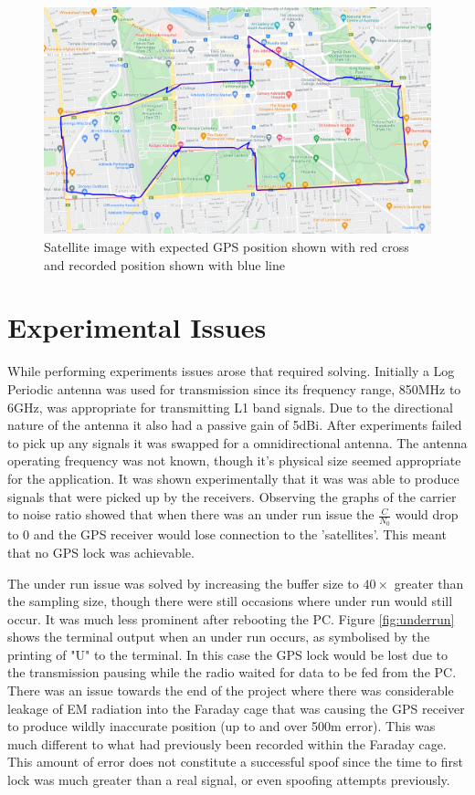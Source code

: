\begin{figure}[H]
    \begin{centering}
        \includegraphics[width=14cm,keepaspectratio]{Figures/2021_3_30_dynamic_CBD_Satellite.PNG}
        \caption{Satellite image with expected GPS position shown with red cross and recorded position shown with blue line}
        \label{fig:CBDdynamicSatelliteImage}
    \end{centering}
\end{figure}

\section{Experimental Issues}
While performing experiments issues arose that required solving. Initially a Log Periodic antenna was used for transmission since its
frequency range, 850MHz to 6GHz, was appropriate for transmitting L1 band signals. Due to the directional nature of the antenna it also had a passive gain of 5dBi. 
After experiments failed to pick up any signals it was swapped for a omnidirectional antenna. The
antenna operating frequency was not known, though it's physical size seemed appropriate for the application. 
It was shown experimentally that it was
was able to produce signals that were picked up by the receivers. Observing the graphs of the carrier to noise ratio showed that when there was an under run
issue the $\frac{C}{N_0}$ would drop to 0 and the GPS receiver would lose connection to the 'satellites'. This meant that no GPS lock was achievable.

The under run issue was solved by increasing the buffer size to $40\times$ greater than the sampling size, though there were still occasions where under run would still
occur. It was much less prominent after rebooting the PC. Figure \ref{fig:underrun} shows the terminal output when an under run occurs, as symbolised by the printing of
"U" to the terminal. In this case the GPS lock would be lost due to the transmission pausing while the radio waited for data to be fed from the PC.
There was an issue towards the end of the project where there was considerable leakage of EM radiation into the Faraday cage that was causing the GPS receiver to produce
wildly inaccurate position (up to and over 500m error). This was much different to what had previously been recorded within the Faraday cage. This amount of error does
not constitute a successful spoof since the time to first lock was much greater than a real signal, or even spoofing attempts previously. 

